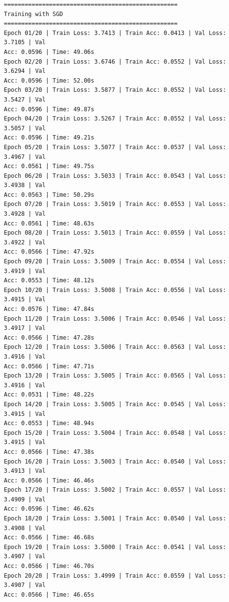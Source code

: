 \documentclass[11pt]{article}
\begin{document}
\begin{Verbatim}[commandchars=\\\{\}]
==================================================
Training with SGD
==================================================
Epoch 01/20 | Train Loss: 3.7413 | Train Acc: 0.0413 | Val Loss: 3.7105 | Val
Acc: 0.0596 | Time: 49.06s
Epoch 02/20 | Train Loss: 3.6746 | Train Acc: 0.0552 | Val Loss: 3.6294 | Val
Acc: 0.0596 | Time: 52.00s
Epoch 03/20 | Train Loss: 3.5877 | Train Acc: 0.0552 | Val Loss: 3.5427 | Val
Acc: 0.0596 | Time: 49.87s
Epoch 04/20 | Train Loss: 3.5267 | Train Acc: 0.0552 | Val Loss: 3.5057 | Val
Acc: 0.0596 | Time: 49.21s
Epoch 05/20 | Train Loss: 3.5077 | Train Acc: 0.0537 | Val Loss: 3.4967 | Val
Acc: 0.0561 | Time: 49.75s
Epoch 06/20 | Train Loss: 3.5033 | Train Acc: 0.0543 | Val Loss: 3.4938 | Val
Acc: 0.0563 | Time: 50.29s
Epoch 07/20 | Train Loss: 3.5019 | Train Acc: 0.0553 | Val Loss: 3.4928 | Val
Acc: 0.0561 | Time: 48.63s
Epoch 08/20 | Train Loss: 3.5013 | Train Acc: 0.0559 | Val Loss: 3.4922 | Val
Acc: 0.0566 | Time: 47.92s
Epoch 09/20 | Train Loss: 3.5009 | Train Acc: 0.0554 | Val Loss: 3.4919 | Val
Acc: 0.0553 | Time: 48.12s
Epoch 10/20 | Train Loss: 3.5008 | Train Acc: 0.0556 | Val Loss: 3.4915 | Val
Acc: 0.0576 | Time: 47.84s
Epoch 11/20 | Train Loss: 3.5006 | Train Acc: 0.0546 | Val Loss: 3.4917 | Val
Acc: 0.0566 | Time: 47.28s
Epoch 12/20 | Train Loss: 3.5006 | Train Acc: 0.0563 | Val Loss: 3.4916 | Val
Acc: 0.0566 | Time: 47.71s
Epoch 13/20 | Train Loss: 3.5005 | Train Acc: 0.0565 | Val Loss: 3.4916 | Val
Acc: 0.0531 | Time: 48.22s
Epoch 14/20 | Train Loss: 3.5005 | Train Acc: 0.0545 | Val Loss: 3.4915 | Val
Acc: 0.0553 | Time: 48.94s
Epoch 15/20 | Train Loss: 3.5004 | Train Acc: 0.0548 | Val Loss: 3.4915 | Val
Acc: 0.0566 | Time: 47.38s
Epoch 16/20 | Train Loss: 3.5003 | Train Acc: 0.0540 | Val Loss: 3.4913 | Val
Acc: 0.0566 | Time: 46.46s
Epoch 17/20 | Train Loss: 3.5002 | Train Acc: 0.0557 | Val Loss: 3.4909 | Val
Acc: 0.0596 | Time: 46.62s
Epoch 18/20 | Train Loss: 3.5001 | Train Acc: 0.0540 | Val Loss: 3.4908 | Val
Acc: 0.0566 | Time: 46.68s
Epoch 19/20 | Train Loss: 3.5000 | Train Acc: 0.0541 | Val Loss: 3.4907 | Val
Acc: 0.0566 | Time: 46.70s
Epoch 20/20 | Train Loss: 3.4999 | Train Acc: 0.0559 | Val Loss: 3.4907 | Val
Acc: 0.0566 | Time: 46.65s


\end{Verbatim}
\end{document}
